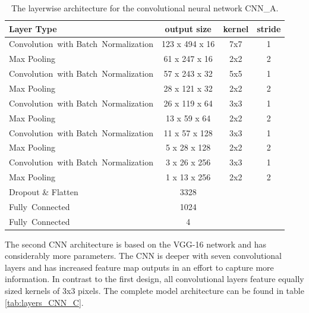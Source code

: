  \begin{table}[]
  \centering
  \begin{tabularx}{\textwidth}{Xccc}
  \toprule
Layer Type                                          & output size    & kernel & stride  \\ \midrule
\mbox{Convolution with} \mbox{Batch Normalization}  & 123 x 494 x 16 & 7x7    & 1       \\ 
Max Pooling                                         & 61 x 247 x 16  & 2x2    & 2       \\ 
\mbox{Convolution with} \mbox{Batch Normalization}  & 57 x 243 x 32  & 5x5    & 1       \\ 
Max Pooling                                         & 28 x 121 x 32  & 2x2    & 2       \\ 
\mbox{Convolution with} \mbox{Batch Normalization}  & 26 x 119 x 64  & 3x3    & 1       \\ 
Max Pooling                                         & 13 x 59 x 64   & 2x2    & 2       \\ 
\mbox{Convolution with} \mbox{Batch Normalization}  & 11 x 57 x 128  & 3x3    & 1       \\ 
Max Pooling                                         & 5 x 28 x 128   & 2x2    & 2       \\ 
\mbox{Convolution with} \mbox{Batch Normalization}  & 3 x 26 x 256   & 3x3    & 1       \\ 
Max Pooling                                         & 1 x 13 x 256   & 2x2    & 2       \\ 
Dropout \& Flatten                                  & 3328           &        &         \\ 
\mbox{Fully Connected}                              & 1024           &        &         \\ 
\mbox{Fully Connected}                              & 4              &        &         \\ 
  \bottomrule
  \end{tabularx}
  \caption{The layerwise architecture for the convolutional neural network CNN\_A.}
  \label{tab:layers_CNN_A}
  \end{table}

The second CNN architecture is based on the VGG-16 network\cite{simonyan2014very} and has considerably more parameters. The CNN is deeper with seven convolutional layers and has increased feature map outputs in an effort to capture more information. In contrast to the first design, all convolutional layers feature equally sized kernels of 3x3 pixels. The complete model architecture can be found in table \ref{tab:layers_CNN_C}.

